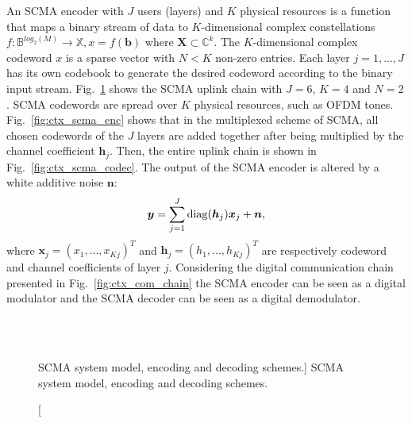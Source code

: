 An SCMA encoder with $J$ users (layers) and $K$ physical resources is a function
that maps a binary stream of data to $K$-dimensional complex constellations
$f : \mathbb{B}^{log_{2}(M)} \rightarrow \mathbb{X}, x = f(\bm{b})$ where
$\bm{X} \subset \mathbb{C}^k$. The $K$-dimensional complex codeword $x$ is a
sparse vector with $N < K$ non-zero entries. Each layer $j=1, ..., J$ has its
own codebook to generate the desired codeword according to the binary input
stream. Fig.~\ref{fig:ctx_scma} shows the SCMA uplink chain with $J = 6$,
$K = 4$ and $N = 2$. SCMA codewords are spread over $K$ physical resources, such
as OFDM tones. Fig.~\ref{fig:ctx_scma_enc} shows that in the multiplexed scheme
of SCMA, all chosen codewords of the $J$ layers are added together after being
multiplied by the channel coefficient $\bm{h}_j$. Then, the entire uplink chain
is shown in Fig.~\ref{fig:ctx_scma_codec}. The output of the SCMA encoder is
altered by a white additive noise $\bm{n}$:
\begin{equation}
  \label{eq:ctx_scma_1}
  \bm{y} = \sum\limits_{j=1}^J \operatorname{diag}(\bm{h}_j)\bm{x}_j+\bm{n},
\end{equation}
where $\bm{x}_j=(x_1,...,x_{Kj})^T$ and $\bm{h}_j=(h_1,...,h_{Kj})^T$ are
respectively codeword and channel coefficients of layer $j$.
Considering the digital communication chain presented in
Fig.~\ref{fig:ctx_com_chain} the SCMA encoder can be seen as a digital modulator
and the SCMA decoder can be seen as a digital demodulator.

\begin{figure}%
  \centering
  \\
  \\
  \quad
  \caption
    [SCMA system model, encoding and decoding schemes.]
    {SCMA system model, encoding and decoding schemes.}
  \label{fig:ctx_scma}
\end{figure}

